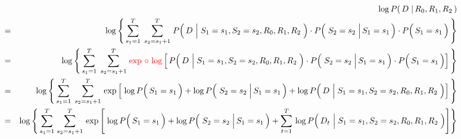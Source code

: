 \begin{eqnarray*}
&&
	\log P\!\left(\,D \;\vert\, R_{0},R_{1},R_{2}\,\right)
\\
&=&
	\log\left\{\,
		\overset{T}{\underset{s_{1}=1}{\sum}}\;\,
		\overset{T}{\underset{s_{2}=s_{1}+1}{\sum}}\;
			P\!\left(\,D\,\left\vert\;S_{1}\overset{{\color{white}1}}{=}s_{1},S_{2}=s_{2},R_{0},R_{1},R_{2}\right.\,\right)
			\cdot
			P\!\left(\,\left.S_{2}\overset{{\color{white}1}}{=}s_{2}\;\right\vert S_{1}=s_{1}\,\right)
			\cdot
			P\!\left(\,S_{1}\overset{{\color{white}1}}{=}s_{1}\,\right)
		\,\right\}
\\
&=&
	\log\left\{\,
		\overset{T}{\underset{s_{1}=1}{\sum}}\;\,
		\overset{T}{\underset{s_{2}=s_{1}+1}{\sum}}\;
		{\color{red}\exp\,\circ\,\log}
		\left[\,
			P\!\left(\,D\,\left\vert\;S_{1}\overset{{\color{white}1}}{=}s_{1},S_{2}=s_{2},R_{0},R_{1},R_{2}\right.\,\right)
			\cdot
			P\!\left(\,\left.S_{2}\overset{{\color{white}1}}{=}s_{2}\;\right\vert S_{1}=s_{1}\,\right)
			\cdot
			P\!\left(\,S_{1}\overset{{\color{white}1}}{=}s_{1}\,\right)
			\right]
		\,\right\}
\\
&=&
	\log\left\{\,
		\overset{T}{\underset{s_{1}=1}{\sum}}\;\,
		\overset{T}{\underset{s_{2}=s_{1}+1}{\sum}}\,
		\exp
		\left[\;
			\log P\!\left(\,S_{1}\overset{{\color{white}1}}{=}s_{1}\,\right)
			+
			\log P\!\left(\,\left.S_{2}\overset{{\color{white}1}}{=}s_{2}\;\right\vert S_{1}=s_{1}\,\right)
			+
			\log P\!\left(\,D\,\left\vert\;S_{1}\overset{{\color{white}1}}{=}s_{1},S_{2}=s_{2},R_{0},R_{1},R_{2}\right.\,\right)
			\right]
		\,\right\}
\\
&=&
	\log\left\{\,
		\overset{T}{\underset{s_{1}=1}{\sum}}\;
		\overset{T}{\underset{s_{2}=s_{1}+1}{\sum}}\,
		\exp
		\left[\;
			\log P\!\left(\,S_{1}\overset{{\color{white}1}}{=}s_{1}\,\right)
			+
			\log P\!\left(\,\left.S_{2}\overset{{\color{white}1}}{=}s_{2}\;\right\vert S_{1}=s_{1}\,\right)
			+
			\overset{T}{\underset{t=1}{\sum}}\,
			\log P\!\left(\,D_{t}\,\left\vert\;S_{1}\overset{{\color{white}1}}{=}s_{1},S_{2}=s_{2},R_{0},R_{1},R_{2}\right.\,\right)
			\right]
		\right\}
\end{eqnarray*}
